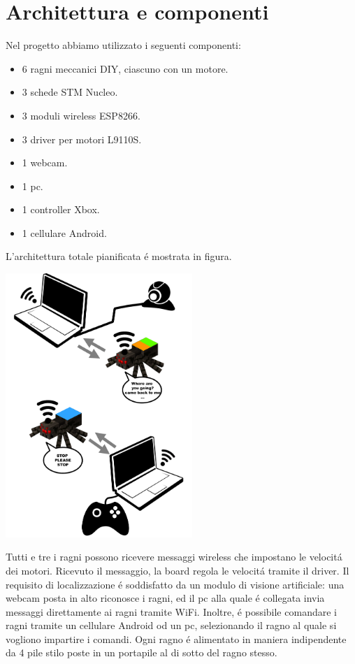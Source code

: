 \documentclass [11pt ,a4paper ,twoside ]{report}
\begin{document}
\chapter{Architettura e componenti}

Nel progetto abbiamo utilizzato i seguenti componenti:
\begin{itemize}
\item 6 ragni meccanici DIY, ciascuno con un motore.
\item 3 schede STM Nucleo.
\item 3 moduli wireless ESP8266.
\item 3 driver per motori L9110S.
\item 1 webcam.
\item 1 pc.
\item 1 controller Xbox.
\item 1 cellulare Android.
\end{itemize}

L'architettura totale pianificata \'e mostrata in figura. 

\begin{center}
\includegraphics[keepaspectratio, width=200pt]{Images/Infographic.png}
\end{center}

Tutti e tre i ragni possono ricevere messaggi wireless che impostano le velocit\'a dei motori. Ricevuto il messaggio, la board regola le velocit\'a tramite il driver. Il requisito di localizzazione \'e soddisfatto da un modulo di visione artificiale: una webcam posta in alto riconosce i ragni, ed il pc alla quale \'e collegata invia messaggi direttamente ai ragni tramite WiFi. Inoltre, \'e possibile comandare i ragni tramite un cellulare Android od un pc, selezionando il ragno al quale si vogliono impartire i comandi. Ogni ragno \'e alimentato in maniera indipendente da 4 pile stilo poste in un portapile al di sotto del ragno stesso.
\end{document}
